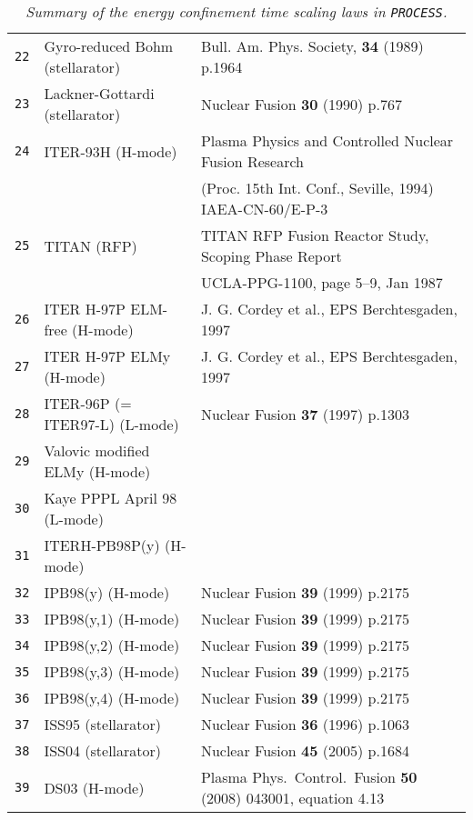 \documentclass[11pt,a4paper]{report}
\newcommand{\process}{\mbox{\texttt{PROCESS}}}
\begin{document}
\begin{table}[tbph]
\begin{center}
\begin{tabular}{||c||l|l||}
\texttt{22} & Gyro-reduced Bohm (stellarator) & Bull. Am. Phys. Society, \textbf{34}
(1989) p.1964 \\
\texttt{23} & Lackner-Gottardi (stellarator) & Nuclear Fusion \textbf{30} (1990) p.767 \\
\texttt{24} & ITER-93H (H-mode) & Plasma Physics and Controlled Nuclear Fusion
Research \\
 & & (Proc. 15th Int. Conf., Seville, 1994) IAEA-CN-60/E-P-3 \\
\texttt{25} & TITAN (RFP) & TITAN RFP Fusion Reactor Study, Scoping Phase
Report \\
 & & UCLA-PPG-1100, page 5--9, Jan 1987 \\
\texttt{26} & ITER H-97P ELM-free (H-mode) & J. G. Cordey et al., EPS
Berchtesgaden, 1997 \\
\texttt{27} & ITER H-97P ELMy (H-mode) & J. G. Cordey et al., EPS
Berchtesgaden, 1997 \\
\texttt{28} & ITER-96P (= ITER97-L) (L-mode) & Nuclear Fusion \textbf{37} (1997) p.1303 \\
\texttt{29} & Valovic modified ELMy (H-mode) &  \\
\texttt{30} & Kaye PPPL April 98 (L-mode) &  \\
\texttt{31} & ITERH-PB98P(y) (H-mode) &  \\
\texttt{32} & IPB98(y) (H-mode) & Nuclear Fusion \textbf{39} (1999) p.2175 \\
\texttt{33} & IPB98(y,1) (H-mode) & Nuclear Fusion \textbf{39} (1999) p.2175 \\
\texttt{34} & IPB98(y,2) (H-mode) & Nuclear Fusion \textbf{39} (1999) p.2175 \\
\texttt{35} & IPB98(y,3) (H-mode) & Nuclear Fusion \textbf{39} (1999) p.2175 \\
\texttt{36} & IPB98(y,4) (H-mode) & Nuclear Fusion \textbf{39} (1999) p.2175 \\
\texttt{37} & ISS95 (stellarator) & Nuclear Fusion \textbf{36} (1996) p.1063 \\
\texttt{38} & ISS04 (stellarator) & Nuclear Fusion \textbf{45} (2005) p.1684 \\
\texttt{39} & DS03 (H-mode) & Plasma Phys.\ Control.\ Fusion \textbf{50} (2008) 043001, equation 4.13 \\
\hline
\end{tabular}
\normalsize
\end{center}
\caption[List of available energy confinement scaling laws]
{\label{tab:scaling_laws}
  \textit{Summary of the energy confinement time scaling laws in \process.}
}
\end{table}
\end{document}
